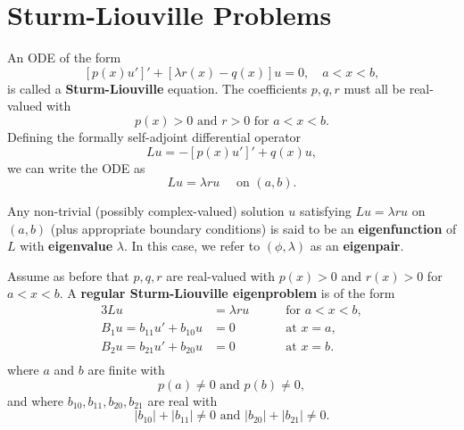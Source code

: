 

\section{Sturm-Liouville Problems}

An ODE of the form
\[[p(x)u']' + [\lambda r(x) - q(x)]u = 0, \quad a < x < b,\]
is called a \textbf{Sturm-Liouville} equation. The coefficients \(p, q, r\) must all be real-valued with
\[p(x) > 0 \text{ and } r > 0 \text{ for } a < x < b.\]
Defining the formally self-adjoint differential operator
\[Lu = -[p(x)u']' + q(x)u,\]
we can write the ODE as
\[Lu = \lambda ru \quad \text{ on } (a,b).\]

Any non-trivial (possibly complex-valued) solution \(u\) satisfying \(Lu = \lambda ru\) on \((a, b)\) (plus appropriate boundary conditions) is said to be an \textbf{eigenfunction} of \(L\) with \textbf{eigenvalue} \(\lambda\). In this case, we refer to \((\phi, \lambda)\) as an \textbf{eigenpair}.


\bigskip
Assume as before that \(p, q, r\) are real-valued with \(p(x) > 0\) and \(r(x) > 0\) for \(a < x < b\). A \textbf{regular Sturm-Liouville eigenproblem} is of the form
\begin{alignat*}{3}
    Lu                        & = \lambda ru & \quad & \text{ for } a < x < b, \\
    B_1u = b_{11}u' + b_{10}u & = 0          & \quad & \text{ at } x = a,      \\
    B_2u = b_{21}u' + b_{20}u & = 0          & \quad & \text{ at } x = b.      \\
\end{alignat*}
where \(a\) and \(b\) are finite with
\[p(a) \neq 0 \text{ and } p(b) \neq 0,\]
and where \(b_{10}, b_{11}, b_{20}, b_{21}\) are real with
\[|b_{10}| + |b_{11}| \neq 0 \text{ and } |b_{20}| + |b_{21}| \neq 0.\]

